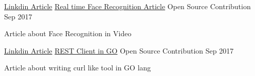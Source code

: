

\begin{cventries}


  \cventry
    {\href{https://www.linkedin.com/pulse/real-time-face-recognition-using-facenet-ishwar-sawale/}{Linkdin Article}} %
    {\href{https://www.linkedin.com/pulse/real-time-face-recognition-using-facenet-ishwar-sawale/}{Real time Face Recognition Article}} %
    {Open Source Contribution} %
    {Sep 2017} %
    {
      \begin{cvitems} %
        \item {Article about Face Recognition in Video}
      \end{cvitems}
    }

  \cventry
    {\href{https://goo.gl/xMAZcK}{Linkdin Article}} %
    {\href{https://goo.gl/xMAZcK}{REST Client in GO}} %
    {Open Source Contribution} %
    {Sep 2017} %
    {
      \begin{cvitems} %
        \item {Article about writing curl like tool in GO lang}
      \end{cvitems}
    }
    

\end{cventries}

